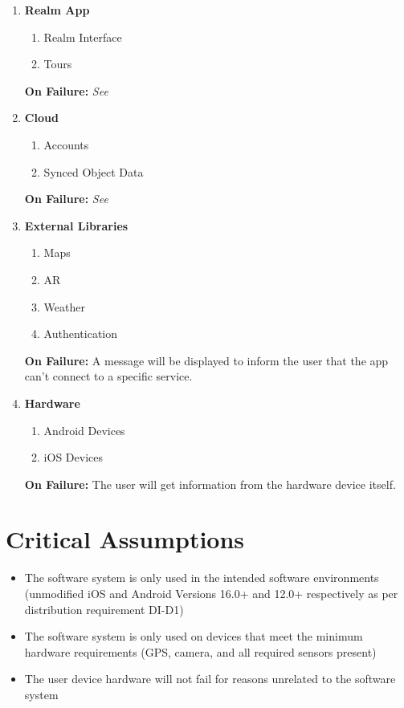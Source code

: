 \documentclass{article}
\begin{document}
\begin{enumerate}[label=\textbf{\arabic*.}]
    \item \textbf{Realm App}
    \begin{enumerate}
        \item Realm Interface
        \item Tours
    \end{enumerate}
    \textbf{On Failure:} \emph{See }
    \item \textbf{Cloud}
    \begin{enumerate}
        \item Accounts
        \item Synced Object Data
    \end{enumerate}
    \textbf{On Failure:} \emph{See }
    \item \textbf{External Libraries}
    \begin{enumerate}
        \item Maps
        \item AR
        \item Weather
        \item Authentication
    \end{enumerate}
    \textbf{On Failure:} A message will be displayed to inform the user that the app can't connect to a specific service.
    \item \textbf{Hardware}
    \begin{enumerate}
        \item Android Devices
        \item iOS Devices
    \end{enumerate}
    \textbf{On Failure:} The user will get information from the hardware device itself.
\end{enumerate}

\section{Critical Assumptions}

\begin{itemize}
    \item The software system is only used in the intended software environments (unmodified iOS and Android Versions 16.0+ and 12.0+ respectively as per distribution requirement DI-D1)
    \item The software system is only used on devices that meet the minimum hardware requirements (GPS, camera, and all required sensors present)
    \item The user device hardware will not fail for reasons unrelated to the software system
\end{itemize}
\end{document}
